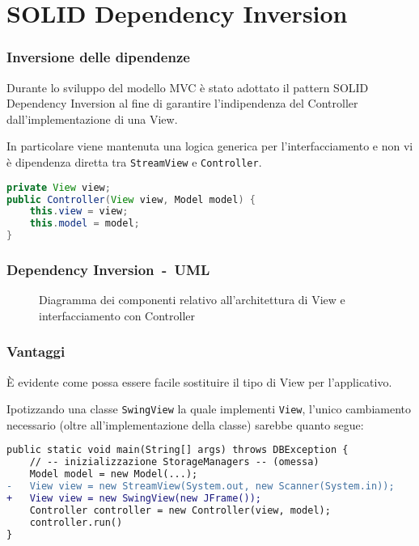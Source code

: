 \section{SOLID Dependency Inversion}
\begin{frame}[fragile]
    \frametitle{Inversione delle dipendenze}

    Durante lo sviluppo del modello MVC è stato adottato il pattern SOLID Dependency Inversion al fine di garantire l'indipendenza del Controller dall'implementazione di una View.\pause%
    
    In particolare viene mantenuta una logica generica per l'interfacciamento e non vi è dipendenza diretta tra \texttt{StreamView} e \texttt{Controller}.\pause%

    \lstset{style=java}
    \begin{lstlisting}[language=java, caption={Snippet tratto dal costruttore di Controller}]
private View view;
public Controller(View view, Model model) {
    this.view = view;
    this.model = model;
}
    \end{lstlisting}
\end{frame}

\begin{frame}
    \frametitle{Dependency Inversion~-~UML}
    \begin{figure}
        \centering
        \caption{Diagramma dei componenti relativo all'architettura di View e interfacciamento con Controller}
    \end{figure}
\end{frame}

\begin{frame}[fragile]
    \frametitle{Vantaggi}

    È evidente come possa essere facile sostituire il tipo di View per l'applicativo.

    Ipotizzando una classe \texttt{SwingView} la quale implementi \texttt{View}, l'unico cambiamento necessario (oltre all'implementazione della classe) sarebbe quanto segue:

    \lstset{style=java}
    \begin{lstlisting}[language=diff, caption={EntryPoint.java\#main}]
public static void main(String[] args) throws DBException {
    // -- inizializzazione StorageManagers -- (omessa)
    Model model = new Model(...);
-   View view = new StreamView(System.out, new Scanner(System.in));
+   View view = new SwingView(new JFrame());
    Controller controller = new Controller(view, model);
    controller.run()
}
    \end{lstlisting}
\end{frame}